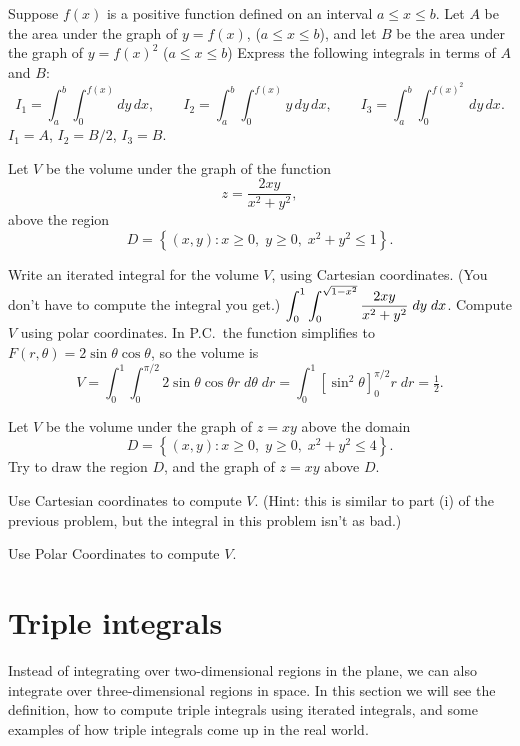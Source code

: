 \problem Suppose $f(x)$ is a positive function defined on an interval 
$a\le x\le b$.  
Let $A$ be the area under the graph of $y=f(x)$, ($a\le x\le b$), and
let $B$ be the area under the graph of $y=f(x)^2$ ($a\le x\le b$)
Express the following integrals in terms of $A$ and $B$:
\[
I_1 = \int_a^b \int_0^{f(x)} dy\, dx,
\qquad
I_2 = \int_a^b \int_0^{f(x)} y\,dy\, dx,
\qquad
I_3 = \int_a^b \int_0^{f(x)^2} \,dy\, dx.
\]
\answer
$I_1 = A$,
$I_2 = B/2$,
$I_3= B$.
\endanswer

\problem Let $V$ be the volume under the graph of the function 
\[
z=\frac{2xy}{x^2+y^2},
\]
above the region 
\[
D = \left\{ (x, y) : x\ge0,\;  y\ge0,\; x^2+y^2\le1 \right\}.
\]

\subprob Write an iterated integral for the volume $V$, using 
Cartesian coordinates.  (You don't have to compute the integral you
get.)
\answer
$\displaystyle\int_0^1 \int_0^{\sqrt{1-x^2}} \frac{2xy}{x^2+y^2}\; dy\; dx$.
\endanswer
\subprob Compute $V$ using polar coordinates. 
\answer
In P.C.\ the function simplifies to $F(r,\theta) = 2\sin \theta\cos
\theta$, so the volume is
\[
V = \int_0^1 \int_0^{\pi/2} 2\sin\theta\cos\theta r\; d\theta\; dr
=\int_0^1 \left[ \sin^2\theta \right]_0^{\pi/2} r\; dr
=\tfrac12.
\]
\endanswer

\problem  Let $V$ be the volume 
under the graph of $z=xy$ above the domain
\[
D = \left\{ (x, y) : x\ge0,\;  y\ge0,\; x^2+y^2\le 4 \right\}.
\]
Try to draw the region $D$, and the graph of $z=xy$ above $D$.

\subprob Use Cartesian coordinates to compute $V$. 
(Hint: this is similar to part \textsf{(i)} of the previous problem,
but the integral in this problem isn't as bad.)

\subprob Use Polar Coordinates to compute $V$.  
\noproblemfont


\section{Triple integrals}  
Instead of integrating over two-dimensional regions in the plane, we
can also integrate over three-dimensional regions in space.  In this
section we will see the definition, how to compute triple integrals
using iterated integrals, and some examples of how triple integrals
come up in the real world.


